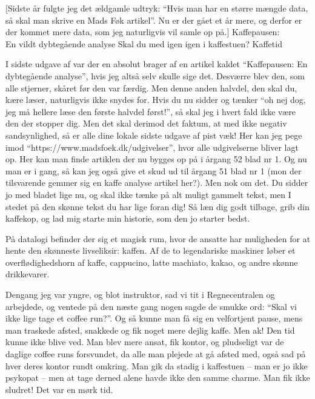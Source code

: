 \begin{article}
[Sidste år fulgte jeg det ældgamle udtryk: ``Hvis man har en større mængde data, så skal man skrive en Mads Føk artikel''. Nu er der gået et år mere, og derfor er der kommet mere data, som jeg naturligvis vil samle op på.]
{Kaffepausen: \\ {\large En vildt dybtegående analyse}}
{Skal du med igen igen i kaffestuen?}
{Kaffetid \protect\coffee\ }

\renewcommand{\figurename}{Figur.}


I sidste udgave af \madsfoek var der en absolut brager af en artikel kaldet ``Kaffepausen: En dybtegående analyse'', hvis jeg altså selv skulle sige det. Desværre blev den, som alle stjerner, skåret før den var færdig. Men denne anden halvdel, den skal du, kære læser, naturligvis ikke snydes for.
Hvis du nu sidder og tænker ``oh nej dog, jeg må hellere læse den første halvdel først!'', så skal jeg i hvert fald ikke være den der stopper dig. Men det skal derimod det faktum, at med ikke negativ sandsynlighed, så er alle dine lokale sidste udgave af \madsfoek pist væk!
Her kan jeg pege imod ``https://www.madsfoek.dk/udgivelser'', hvor alle udgivelserne bliver lagt op. Her kan man finde artiklen der nu bygges op på i årgang 52 blad nr 1. Og nu man er i gang, så kan jeg også give et skud ud til årgang 51 blad nr 1 (mon der tilsvarende gemmer sig en kaffe analyse artikel her?).
Men nok om det. Du sidder jo med bladet lige nu, og skal ikke tænke på alt muligt gammelt tekst, men I stedet på den skønne tekst du har lige foran dig! Så læn dig godt tilbage, grib din kaffekop, og lad mig starte min historie, som den jo starter bedst.

På datalogi befinder der sig et magisk rum, hvor de ansatte har muligheden for at hente den skønneste livseliksir: kaffen. Af de to legendariske maskiner løber et overflødighedshorn af kaffe, cappucino, latte machiato, kakao, og andre skønne drikkevarer.

Dengang jeg var yngre, og blot instruktor, sad vi tit i Regnecentralen og arbejdede, og ventede på den næste gang nogen sagde de smukke ord: ``Skal vi ikke lige tage et coffee run?''. Og så kunne man få sig en velfortjent pause, mens man traskede afsted, snakkede og fik noget mere dejlig kaffe. Men ak! Den tid kunne ikke blive ved. Man blev mere ansat, fik kontor, og pludseligt var de daglige coffee runs forsvundet, da alle man plejede at gå afsted med, også sad på hver deres kontor rundt omkring. Man gik da stadig i kaffestuen -- man er jo ikke psykopat -- men at tage derned alene havde ikke den samme charme. Man fik ikke sludret! Det var en mørk tid.


\end{article}
